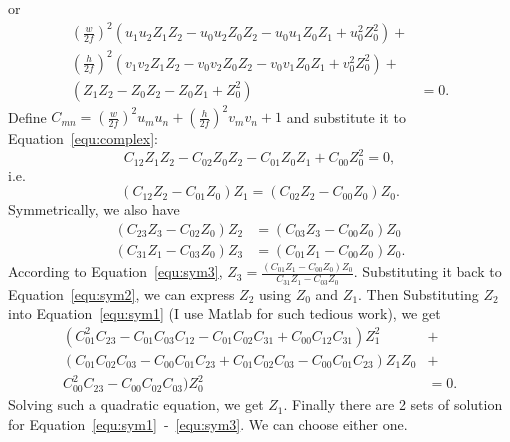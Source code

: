 \documentclass[a4paper]{article}
\begin{document}
or
\begin{align}
(\frac{w}{2f})^2(u_1u_2Z_1Z_2-u_0u_2Z_0Z_2-u_0u_1Z_0Z_1+u_0^2Z_0^2)+ & \nonumber\\
(\frac{h}{2f})^2(v_1v_2Z_1Z_2-v_0v_2Z_0Z_2-v_0v_1Z_0Z_1+v_0^2Z_0^2)+ & \nonumber\\
(Z_1Z_2-Z_0Z_2-Z_0Z_1+Z_0^2) &=0\label{equ:complex}.
\end{align}
Define $C_{mn}=(\frac{w}{2f})^2u_mu_n+(\frac{h}{2f})^2v_mv_n+1$ and substitute it to Equation~\ref{equ:complex}:
\begin{equation}
C_{12}Z_1Z_2-C_{02}Z_0Z_2-C_{01}Z_0Z_1+C_{00}Z_0^2=0,
\end{equation}
i.e.
\begin{equation}
(C_{12}Z_2-C_{01}Z_0)Z_1=(C_{02}Z_2-C_{00}Z_0)Z_0 \label{equ:sym1}.
\end{equation}
Symmetrically, we also have
\begin{align}
(C_{23}Z_3-C_{02}Z_0)Z_2&=(C_{03}Z_3-C_{00}Z_0)Z_0 \label{equ:sym2} \\
(C_{31}Z_1-C_{03}Z_0)Z_3&=(C_{01}Z_1-C_{00}Z_0)Z_0 \label{equ:sym3}.
\end{align}
According to Equation~\ref{equ:sym3}, $Z_3=\frac{(C_{01}Z_1-C_{00}Z_0)Z_0}{C_{31}Z_1-C_{03}Z_0}$.
Substituting it back to Equation~\ref{equ:sym2}, we can express $Z_2$ using $Z_0$ and $Z_1$.
Then Substituting $Z_2$ into Equation~\ref{equ:sym1} (I use Matlab for such tedious work), we get
\begin{align}
(C_{01}^2C_{23}-C_{01}C_{03}C_{12}-C_{01}C_{02}C_{31}+C_{00}C_{12}C_{31})Z_1^2 & +\nonumber\\
(C_{01}C_{02}C_{03}-C_{00}C_{01}C_{23}+C_{01}C_{02}C_{03}-C_{00}C_{01}C_{23})Z_1Z_0 & + \nonumber\\
C_{00}^2C_{23}-C_{00}C_{02}C_{03})Z_0^2&=0.
\end{align}
Solving such a quadratic equation, we get $Z_1$.
Finally there are 2 sets of solution for Equation~\ref{equ:sym1}~-~\ref{equ:sym3}.
We can choose either one.
\end{document}
